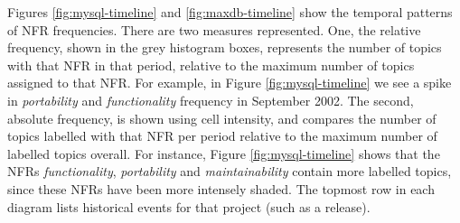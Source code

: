 \documentclass[]{sig-alternate}
\begin{document}
Figures \ref{fig:mysql-timeline} and \ref{fig:maxdb-timeline} show the
temporal patterns of NFR frequencies.
There are two measures represented. 
One, the relative frequency, shown in the grey histogram boxes, represents the number of topics with that NFR in that period, 
relative to the maximum number of topics assigned to that NFR. For example, in Figure \ref{fig:mysql-timeline} we see a spike in \emph{portability} and \emph{functionality} frequency in September 2002.
The second, absolute frequency, is shown using cell intensity, and compares the number of topics labelled with that NFR per period 
relative to the maximum number of labelled topics overall. For instance, Figure \ref{fig:mysql-timeline} shows that the NFRs \emph{functionality}, \emph{portability} and \emph{maintainability} contain more labelled topics, since these NFRs have been more intensely shaded.
The topmost row in each diagram lists historical events for that project (such as a release). 
\end{document}
